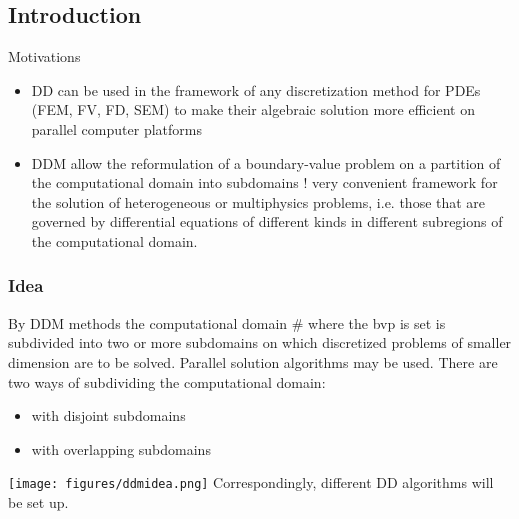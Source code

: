 \subsection{Introduction}
\begin{frame}{Motivations}
  \begin{itemize}
  \item DD can be used in the framework of any discretization method for
PDEs (FEM, FV, FD, SEM) to make their algebraic solution more
efficient on parallel computer platforms
\item DDM allow the reformulation of a boundary-value problem on a
partition of the computational domain into subdomains
! very convenient framework for the solution of heterogeneous or
multiphysics problems, i.e. those that are governed by differential
equations of different kinds in different subregions of the
computational domain.
  \end{itemize}
\end{frame}
\begin{frame}
  \frametitle{Idea}
  By DDM methods the computational domain # where the bvp is set is
subdivided into two or more subdomains on which discretized problems of
smaller dimension are to be solved.
Parallel solution algorithms may be used.
There are two ways of subdividing the computational domain:
\begin{itemize}
\item with disjoint subdomains
\item with overlapping subdomains
\end{itemize}
\texttt{[image: figures/ddmidea.png]}
Correspondingly, different DD algorithms will be set up.
\end{frame}



